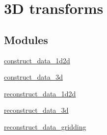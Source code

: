 \hypertarget{group__applications__mri3d}{
\section{3D transforms}
\label{group__applications__mri3d}
}
\subsection*{Modules}
\begin{CompactItemize}
\item 
\hyperlink{group__applications__mri3d__construct__data__1d2d}{construct\_\-data\_\-1d2d}
\item 
\hyperlink{group__applications__mri3d__construct__data__3d}{construct\_\-data\_\-3d}
\item 
\hyperlink{group__applications__mri3d__reconstruct__data__1d2d}{reconstruct\_\-data\_\-1d2d}
\item 
\hyperlink{group__applications__mri3d__reconstruct__data__3d}{reconstruct\_\-data\_\-3d}
\item 
\hyperlink{group__applications__mri3d__reconstruct__data__gridding}{reconstruct\_\-data\_\-gridding}
\end{CompactItemize}
